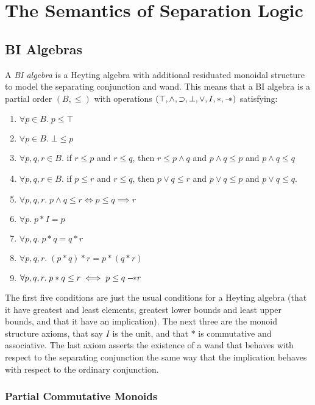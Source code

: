\chapter{The Semantics of Separation Logic}

\section{BI Algebras}

A \emph{BI algebra} is a Heyting algebra with additional residuated
monoidal structure to model the separating conjunction and wand. This
means that a BI algebra is a partial order $(B, \leq)$ with
operations $(\top, \land, \supset, \bot, \vee, I, *, -\!\!*)$
satisfying:

\begin{enumerate}
\item $\forall p \in B.\; p \leq \top$
\item $\forall p \in B.\; \bot \leq p$
\item $\forall p,q,r \in B.$ if $r \leq p$ and $r \leq q$, then
      $r \leq p \land q$ and 
      $p \land q \leq p$ and $p \land q \leq q$
\item $\forall p,q,r \in B.$ if $p \leq r$ and $r \leq q$, then
      $p \vee q \leq r$ and
      $p \vee q \leq p$ and $p \vee q \leq q$.
\item $\forall p, q, r.\; p \land q \leq r \iff p \leq q \implies r$
\item $\forall p.\; p * I = p$
\item $\forall p, q.\; p * q = q * r$
\item $\forall p, q, r.\; (p * q) * r = p * (q * r)$
\item $\forall p, q, r.\; p * q \leq r \iff p \leq q -\!\!* r$
\end{enumerate}

The first five conditions are just the usual conditions for a Heyting
algebra (that it have greatest and least elements, greatest lower
bounds and least upper bounds, and that it have an implication). The
next three are the monoid structure axioms, that say $I$ is the unit,
and that $*$ is commutative and associative. The last axiom asserts
the existence of a wand that behaves with respect to the separating
conjunction the same way that the implication behaves with respect to
the ordinary conjunction.

\subsection{Partial Commutative Monoids}

